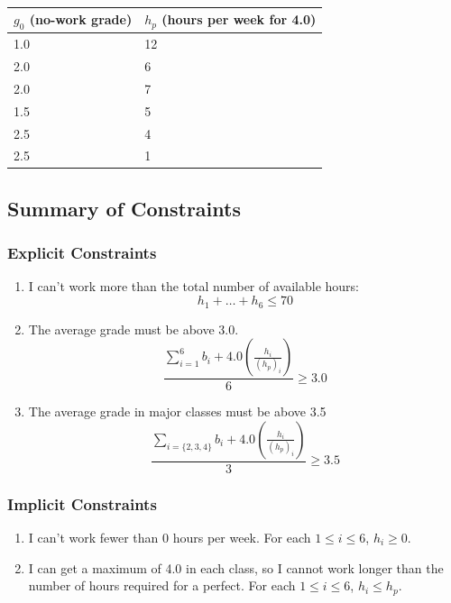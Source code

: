 \documentclass{article}
\begin{document}
\paragraph{}
\begin{tabular}{|l|l|}
\hline
$g_0$ (no-work grade) & $h_p$ (hours per week for 4.0) \\
\hline
1.0 & 12 \\
\hline
2.0 & 6 \\
\hline
2.0 & 7 \\
\hline
1.5 & 5 \\
\hline
2.5 & 4 \\
\hline
2.5 & 1 \\
\hline
\end{tabular}

\subsection{Summary of Constraints}

\subsubsection{Explicit Constraints}
\begin{enumerate}
\item I can't work more than the total number of available hours:
\[ h_1 + \dots + h_6 \leq 70 \]
\item The average grade must be above 3.0.
\[ \frac{\sum_{i = 1}^6 b_i + 4.0 \left( \frac{ h_i }{ \left( h_p \right)_i } \right)}{6} 
	\geq 3.0 \]
\item The average grade in major classes must be above 3.5
\[ \frac{\sum_{i = \{ 2,3,4 \}} b_i + 4.0 \left( \frac{ h_i }{ \left( h_p \right)_i } \right)}{3}
	\geq 3.5 \]
\end{enumerate}

\subsubsection{Implicit Constraints}
\begin{enumerate}
\item I can't work fewer than 0 hours per week.
For each $1 \leq i \leq 6$, $h_i \geq 0$.
\item I can get a maximum of 4.0 in each class,
so I cannot work longer than the number of hours required for a perfect.
For each $1 \leq i \leq 6$, $h_i \leq h_p$.
\end{enumerate}
\end{document}
